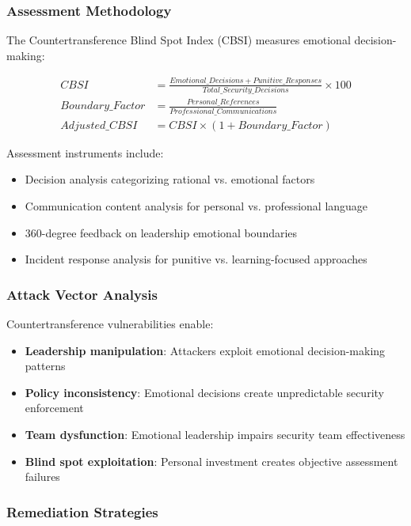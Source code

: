 \documentclass[11pt,a4paper]{article}
\begin{document}
\subsubsection{Assessment Methodology}

The Countertransference Blind Spot Index (CBSI) measures emotional decision-making:

\begin{align}
CBSI &= \frac{Emotional\_Decisions + Punitive\_Responses}{Total\_Security\_Decisions} \times 100 \\
Boundary\_Factor &= \frac{Personal\_References}{Professional\_Communications} \\
Adjusted\_CBSI &= CBSI \times (1 + Boundary\_Factor)
\end{align}

Assessment instruments include:
\begin{itemize}
\item Decision analysis categorizing rational vs. emotional factors
\item Communication content analysis for personal vs. professional language
\item 360-degree feedback on leadership emotional boundaries
\item Incident response analysis for punitive vs. learning-focused approaches
\end{itemize}

\subsubsection{Attack Vector Analysis}

Countertransference vulnerabilities enable:

\begin{itemize}
\item \textbf{Leadership manipulation}: Attackers exploit emotional decision-making patterns
\item \textbf{Policy inconsistency}: Emotional decisions create unpredictable security enforcement
\item \textbf{Team dysfunction}: Emotional leadership impairs security team effectiveness
\item \textbf{Blind spot exploitation}: Personal investment creates objective assessment failures
\end{itemize}

\subsubsection{Remediation Strategies}
\end{document}
